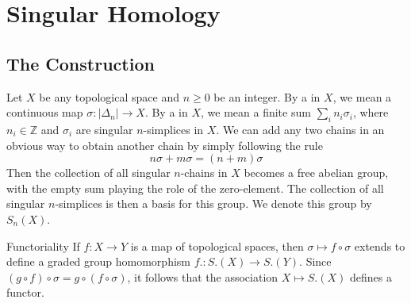 \documentclass[../main.tex]{subfiles}
\begin{document}
\chapter{ Singular Homology }

\section{The Construction}

\begin{definition}{}{}
Let $X$ be any topological space and $n \ge 0$ be an integer. By a  in $X$, we mean a continuous map $\sigma : |\Delta_n| \to X$. By a  in $X$, we mean a finite sum $\sum_i n_i\sigma_i$, where $n_i \in \mathbb{Z}$ and $\sigma_i$ are singular $n$-simplices in $X$. We can add any two chains in an obvious way to obtain another chain by simply following the rule
\[
n\sigma + m\sigma = (n+m)\sigma \tag{4.5}
\]
Then the collection of all singular $n$-chains in $X$ becomes a free abelian group, with the empty sum playing the role of the zero-element. The collection of all singular $n$-simplices is then a basis for this group. We denote this group by $S_n(X)$.
\end{definition}

\begin{proposition}{Functoriality}{}
    If $f: X \to Y$ is a map of topological spaces, then $\sigma \mapsto f \circ \sigma$ extends to define a graded group homomorphism $f. : S.(X) \to S.(Y)$. Since $(g \circ f) \circ \sigma = g \circ (f \circ \sigma)$, it follows that the association $X \mapsto S.(X)$ defines a functor.

\end{proposition}
\end{document}
